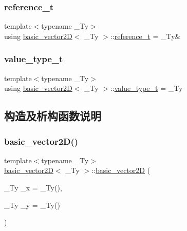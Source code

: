 \subsubsection{\texorpdfstring{reference\+\_\+t}{reference\_t}}
{\footnotesize\ttfamily template$<$typename \+\_\+\+Ty$>$ \\
using \hyperlink{structbasic__vector2_d}{basic\+\_\+vector2D}$<$ \+\_\+\+Ty $>$\+::\hyperlink{structbasic__vector2_d_afa9c650d6178f708c88f7abab001c4a3}{reference\+\_\+t} =  \+\_\+\+Ty\&}

\mbox{\label{structbasic__vector2_d_a3a8e15c6a773a34b04090604c981e63e}} 
\subsubsection{\texorpdfstring{value\+\_\+type\+\_\+t}{value\_type\_t}}
{\footnotesize\ttfamily template$<$typename \+\_\+\+Ty$>$ \\
using \hyperlink{structbasic__vector2_d}{basic\+\_\+vector2D}$<$ \+\_\+\+Ty $>$\+::\hyperlink{structbasic__vector2_d_a3a8e15c6a773a34b04090604c981e63e}{value\+\_\+type\+\_\+t} =  \+\_\+\+Ty}



\subsection{构造及析构函数说明}
\mbox{\label{structbasic__vector2_d_ad8b15c63d5ad6e86e1192ff820f53a67}} 
\subsubsection{\texorpdfstring{basic\+\_\+vector2\+D()}{basic\_vector2D()}\hspace{0.1cm}{\footnotesize\ttfamily [1/2]}}
{\footnotesize\ttfamily template$<$typename \+\_\+\+Ty$>$ \\
\hyperlink{structbasic__vector2_d}{basic\+\_\+vector2D}$<$ \+\_\+\+Ty $>$\+::\hyperlink{structbasic__vector2_d}{basic\+\_\+vector2D} (\begin{DoxyParamCaption}\item[{\+\_\+\+Ty}]{\+\_\+x = {\ttfamily \+\_\+Ty()},  }\item[{\+\_\+\+Ty}]{\+\_\+y = {\ttfamily \+\_\+Ty()} }\end{DoxyParamCaption})\hspace{0.3cm}{\ttfamily [inline]}}

